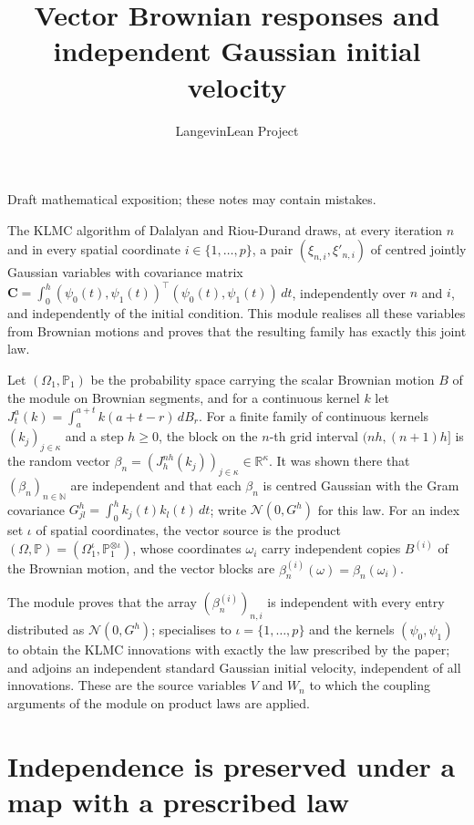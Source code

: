 \documentclass[11pt,a4paper]{article}
\title{\texorpdfstring{Vector Brownian responses and independent Gaussian initial velocity}{Vector Brownian responses and independent Gaussian initial velocity}}
\author{LangevinLean Project}
\date{}
\begin{document}
\maketitle
Draft mathematical exposition; these notes may contain mistakes.


The KLMC algorithm of Dalalyan and Riou-Durand draws, at every iteration \(n\) and in every spatial coordinate \(i\in\{1,\dots,p\}\), a pair \((\xi_{n,i},\xi'_{n,i})\) of centred jointly Gaussian variables with covariance matrix \(\mathbf C=\int_0^h(\psi_0(t),\psi_1(t))^\top(\psi_0(t),\psi_1(t))\,dt\), independently over \(n\) and \(i\), and independently of the initial condition. This module realises all these variables from Brownian motions and proves that the resulting family has exactly this joint law.




Let \((\Omega_1,\mathbb P_1)\) be the probability space carrying the scalar Brownian motion \(B\) of the module on Brownian segments, and for a continuous kernel \(k\) let \(J^a_t(k)=\int_a^{a+t}k(a+t-r)\,dB_r\). For a finite family of continuous kernels \((k_j)_{j\in\kappa}\) and a step \(h\ge0\), the block on the \(n\)-th grid interval \((nh,(n+1)h]\) is the random vector \(\beta_n=(J^{nh}_h(k_j))_{j\in\kappa}\in\mathbb R^\kappa\). It was shown there that \((\beta_n)_{n\in\mathbb N}\) are independent and that each \(\beta_n\) is centred Gaussian with the Gram covariance \(G^h_{jl}=\int_0^hk_j(t)k_l(t)\,dt\); write \(\mathcal N(0,G^h)\) for this law. For an index set \(\iota\) of spatial coordinates, the vector source is the product \((\Omega,\mathbb P)=(\Omega_1^\iota,\mathbb P_1^{\otimes\iota})\), whose coordinates \(\omega_i\) carry independent copies \(B^{(i)}\) of the Brownian motion, and the vector blocks are \(\beta_n^{(i)}(\omega)=\beta_n(\omega_i)\).




The module proves that the array \((\beta^{(i)}_n)_{n,i}\) is independent with every entry distributed as \(\mathcal N(0,G^h)\); specialises to \(\iota=\{1,\dots,p\}\) and the kernels \((\psi_0,\psi_1)\) to obtain the KLMC innovations with exactly the law prescribed by the paper; and adjoins an independent standard Gaussian initial velocity, independent of all innovations. These are the source variables \(V\) and \(W_n\) to which the coupling arguments of the module on product laws are applied.


\section{\texorpdfstring{Independence is preserved under a map with a prescribed law}{Independence is preserved under a map with a prescribed law}}
\end{document}

